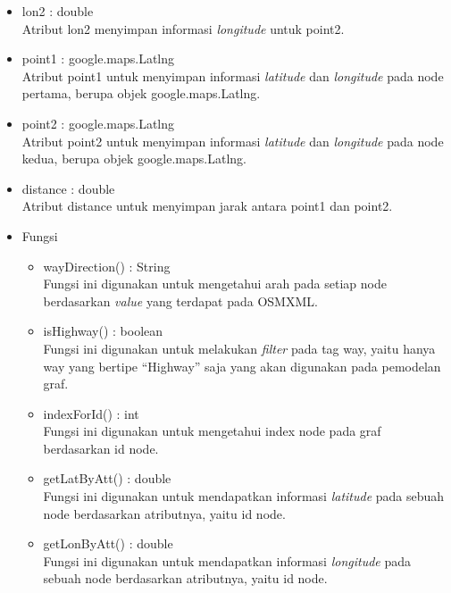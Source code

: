 \begin{itemize}
\begin{itemize}
\begin{itemize}
      \item lon2 : double\\
      Atribut lon2 menyimpan informasi \textit{longitude} untuk point2.
      
      \item point1 : google.maps.Latlng\\
      Atribut point1 untuk menyimpan informasi \textit{latitude} dan
      \textit{longitude} pada node pertama, berupa objek google.maps.Latlng.
      
      \item point2 : google.maps.Latlng\\
      Atribut point2 untuk menyimpan informasi \textit{latitude} dan
      \textit{longitude} pada node kedua, berupa objek google.maps.Latlng.
      
      \item distance : double\\
      Atribut distance untuk menyimpan jarak antara point1 dan point2.
    \end{itemize}
  \end{itemize}
  \begin{itemize}
    \item Fungsi
    \begin{itemize}
      \item wayDirection() : String\\
      Fungsi ini digunakan untuk mengetahui arah pada setiap node berdasarkan
      \textit{value} yang terdapat pada OSMXML.
      
      \item isHighway() : boolean\\
      Fungsi ini digunakan untuk melakukan \textit{filter} pada tag way, yaitu
      hanya way yang bertipe ``Highway'' saja yang akan digunakan pada pemodelan
      graf.
      
      \item indexForId() : int\\
      Fungsi ini digunakan untuk mengetahui index node pada graf berdasarkan id
      node.
      
      \item getLatByAtt() : double\\
      Fungsi ini digunakan untuk mendapatkan informasi \textit{latitude} pada
      sebuah node berdasarkan atributnya, yaitu id node.
      
      \item getLonByAtt() : double\\
      Fungsi ini digunakan untuk mendapatkan informasi \textit{longitude} pada
      sebuah node berdasarkan atributnya, yaitu id node.
    \end{itemize}
  \end{itemize}
  

\end{itemize}
